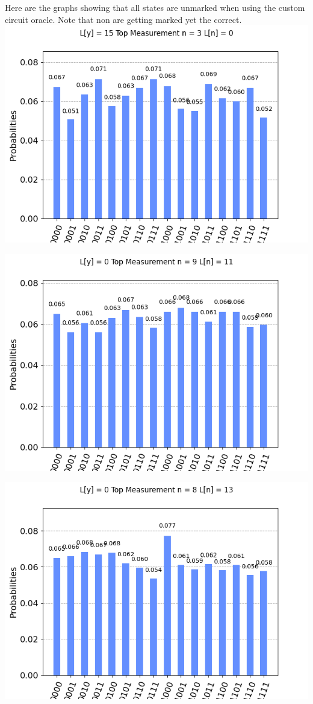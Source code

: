 \documentclass[11pt]{article}
\begin{document}
\newpage
\begin{center}
Here are the graphs showing that all states are unmarked when using the custom circuit oracle. Note that non are getting marked yet the correct.
\includegraphics[width=\textwidth]{custom_0.png}

\includegraphics[width=\textwidth]{custom_1.png}

\includegraphics[width=\textwidth]{custom_2.png}


\end{center}
\end{document}
